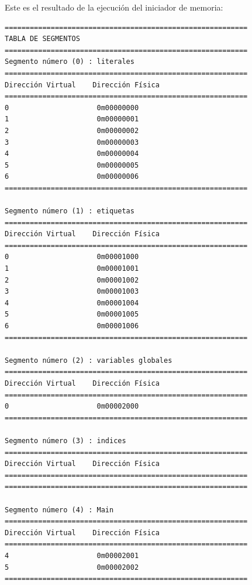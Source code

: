 \noindent
Este es el resultado de la ejecución del iniciador de memoria:
\begin{verbatim}
==========================================================
TABLA DE SEGMENTOS
==========================================================
Segmento número (0) : literales
==========================================================
Dirección Virtual    Dirección Física    
==========================================================
0                     0m00000000            
1                     0m00000001            
2                     0m00000002            
3                     0m00000003            
4                     0m00000004            
5                     0m00000005            
6                     0m00000006            
==========================================================

Segmento número (1) : etiquetas
==========================================================
Dirección Virtual    Dirección Física    
==========================================================
0                     0m00001000            
1                     0m00001001            
2                     0m00001002            
3                     0m00001003            
4                     0m00001004            
5                     0m00001005            
6                     0m00001006            
==========================================================

Segmento número (2) : variables globales
==========================================================
Dirección Virtual    Dirección Física    
==========================================================
0                     0m00002000            
==========================================================

Segmento número (3) : indices
==========================================================
Dirección Virtual    Dirección Física    
==========================================================
==========================================================

Segmento número (4) : Main
==========================================================
Dirección Virtual    Dirección Física    
==========================================================
4                     0m00002001            
5                     0m00002002            
==========================================================


\end{verbatim}

